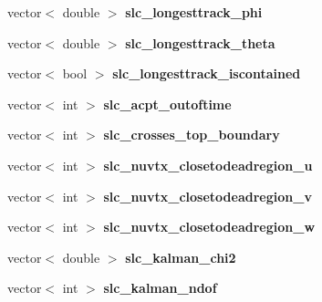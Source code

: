 \begin{DoxyCompactItemize}
\item 
\hypertarget{classUBXSecEvent_a3d3b0be1ba8321dfa3f19fad27ae654c}{vector$<$ double $>$ {\bfseries slc\-\_\-longesttrack\-\_\-phi}}\label{classUBXSecEvent_a3d3b0be1ba8321dfa3f19fad27ae654c}

\item 
\hypertarget{classUBXSecEvent_aa3f16db3a887ed53354cae2bb3de19cb}{vector$<$ double $>$ {\bfseries slc\-\_\-longesttrack\-\_\-theta}}\label{classUBXSecEvent_aa3f16db3a887ed53354cae2bb3de19cb}

\item 
\hypertarget{classUBXSecEvent_a2e715c70dcf023fddf77ef56c85d01cf}{vector$<$ bool $>$ {\bfseries slc\-\_\-longesttrack\-\_\-iscontained}}\label{classUBXSecEvent_a2e715c70dcf023fddf77ef56c85d01cf}

\item 
\hypertarget{classUBXSecEvent_afd52675b8ca60af2941105f9739909a4}{vector$<$ int $>$ {\bfseries slc\-\_\-acpt\-\_\-outoftime}}\label{classUBXSecEvent_afd52675b8ca60af2941105f9739909a4}

\item 
\hypertarget{classUBXSecEvent_ae7aee5c97b811d2e867cab5ec4fa1ffd}{vector$<$ int $>$ {\bfseries slc\-\_\-crosses\-\_\-top\-\_\-boundary}}\label{classUBXSecEvent_ae7aee5c97b811d2e867cab5ec4fa1ffd}

\item 
\hypertarget{classUBXSecEvent_a702fda60b130a5de87b4cd5639b111d6}{vector$<$ int $>$ {\bfseries slc\-\_\-nuvtx\-\_\-closetodeadregion\-\_\-u}}\label{classUBXSecEvent_a702fda60b130a5de87b4cd5639b111d6}

\item 
\hypertarget{classUBXSecEvent_aea1570a2a53f22dcbbe2d0c349502a3b}{vector$<$ int $>$ {\bfseries slc\-\_\-nuvtx\-\_\-closetodeadregion\-\_\-v}}\label{classUBXSecEvent_aea1570a2a53f22dcbbe2d0c349502a3b}

\item 
\hypertarget{classUBXSecEvent_a0e32deb7f9e8d3f4356b52dfa74892ad}{vector$<$ int $>$ {\bfseries slc\-\_\-nuvtx\-\_\-closetodeadregion\-\_\-w}}\label{classUBXSecEvent_a0e32deb7f9e8d3f4356b52dfa74892ad}

\item 
\hypertarget{classUBXSecEvent_a7b3a38020a5ff375b9a9632c6eda9845}{vector$<$ double $>$ {\bfseries slc\-\_\-kalman\-\_\-chi2}}\label{classUBXSecEvent_a7b3a38020a5ff375b9a9632c6eda9845}

\item 
\hypertarget{classUBXSecEvent_ac4a8b79e4a4b02254ede89b475f3ca5c}{vector$<$ int $>$ {\bfseries slc\-\_\-kalman\-\_\-ndof}}\label{classUBXSecEvent_ac4a8b79e4a4b02254ede89b475f3ca5c}


\end{DoxyCompactItemize}
